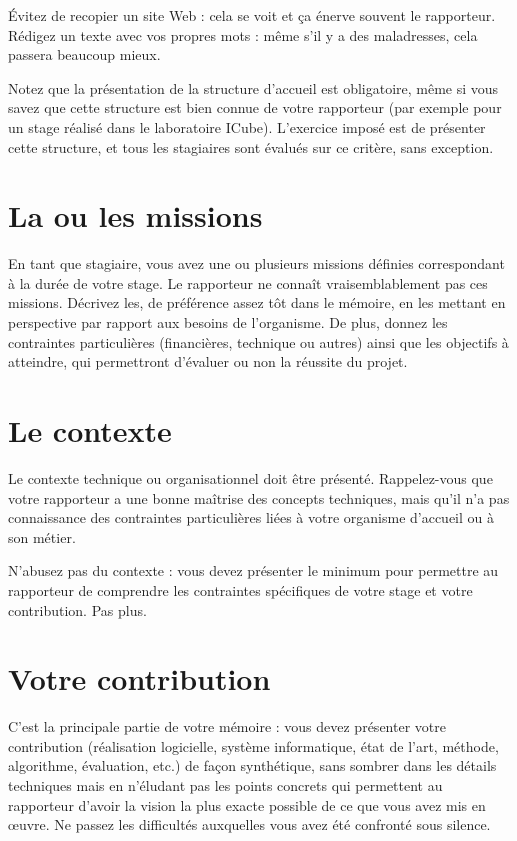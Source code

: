 \documentclass [twoside,openright,a4paper,11pt,french] {report}
\begin{document}
Évitez de recopier un site Web : cela se voit et ça énerve souvent
le rapporteur. Rédigez un texte avec vos propres mots : même s'il y a
des maladresses, cela passera beaucoup mieux.

Notez que la présentation de la structure d'accueil est obligatoire,
même si vous savez que cette structure est bien connue de votre
rapporteur (par exemple pour un stage réalisé dans le laboratoire
ICube). L'exercice imposé est de présenter cette structure, et tous
les stagiaires sont évalués sur ce critère, sans exception.

\section {La ou les missions}
    \label {sec:mission}

En tant que stagiaire, vous avez une ou plusieurs missions définies
correspondant à la durée de votre stage. Le rapporteur ne connaît
vraisemblablement pas ces missions. Décrivez les, de préférence assez
tôt dans le mémoire, en les mettant en perspective par rapport aux
besoins de l'organisme. De plus, donnez les contraintes particulières
(financières, technique ou autres) ainsi que les objectifs à atteindre,
qui permettront d'évaluer ou non la réussite du projet.

\section {Le contexte}

Le contexte technique ou organisationnel doit être présenté.
Rappelez-vous que votre rapporteur a une bonne maîtrise des concepts
techniques, mais qu'il n'a pas connaissance des contraintes particulières
liées à votre organisme d'accueil ou à son métier.

N'abusez pas du contexte : vous devez présenter le minimum pour permettre
au rapporteur de comprendre les contraintes spécifiques de votre stage
et votre contribution. Pas plus.


\section {Votre contribution}

C'est la principale partie de votre mémoire : vous devez présenter votre
contribution (réalisation logicielle, système informatique, état de
l'art, méthode, algorithme, évaluation, etc.) de façon synthétique,
sans sombrer dans les détails techniques mais en n'éludant pas les
points concrets qui permettent au rapporteur d'avoir la vision la plus
exacte possible de ce que vous avez mis en œuvre. Ne passez
les difficultés auxquelles vous avez été confronté sous silence.
\end{document}
